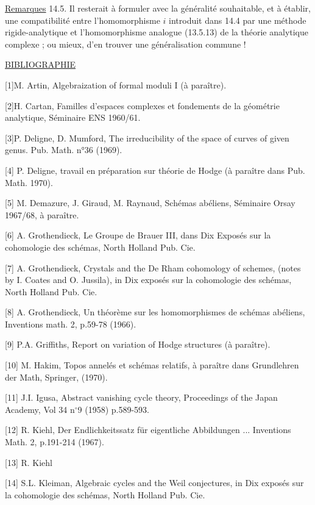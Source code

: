 \underline{Remarques} 14.5. Il resterait à formuler avec la généralité souhaitable, et à établir, une compatibilité entre l'homomorphisme $i$ introduit dans 14.4 par une méthode rigide-analytique et l'homomorphisme analogue (13.5.13) de la théorie analytique complexe ; ou mieux, d'en trouver une généralisation commune !


\underline{BIBLIOGRAPHIE}

[1]\quad M. Artin, Algebraization of formal moduli I (à paraître).

[2]\quad H. Cartan, Familles d'espaces complexes et fondements de la géométrie analytique, Séminaire ENS 1960/61.

[3]\quad P. Deligne, D. Mumford, The irreducibility of the space of curves of given genus. Pub. Math. n°36 (1969).



{[}4] P. Deligne, travail en préparation sur théorie de Hodge (à paraître dans Pub. Math. 1970).

{[}5] M. Demazure, J. Giraud, M. Raynaud, Schémas abéliens, Séminaire Orsay 1967/68, à paraître.

{[}6] A. Grothendieck, Le Groupe de Brauer III, dans Dix Exposés sur la cohomologie des schémas, North Holland Pub. Cie.

{[}7] A. Grothendieck, Crystals and the De Rham cohomology of schemes, (notes by I. Coates and O. Jussila), in Dix exposés sur la cohomologie des schémas, North Holland Pub. Cie.

{[}8] A. Grothendieck, Un théorème sur les homomorphismes de schémas abéliens, Inventions math. 2, p.59-78 (1966).

{[}9] P.A. Griffiths, Report on variation of Hodge structures (à paraître).

{[}10] M. Hakim, Topos annelés et schémas relatifs, à paraître dans Grundlehren der Math, Springer, (1970).

{[}11] J.I. Igusa, Abstract vanishing cycle theory, Proceedings of the Japan Academy, Vol 34 n$^\circ$9 (1958) p.589-593.

{[}12] R. Kiehl, Der Endlichkeitssatz für eigentliche Abbildungen ... Inventions Math. 2, p.191-214 (1967).

{[}13] R. Kiehl



{[}14] S.L. Kleiman, Algebraic cycles and the Weil conjectures, in Dix exposés sur la cohomologie des schémas, North Holland Pub. Cie.

